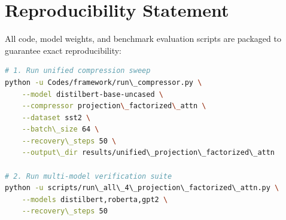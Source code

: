 \section{Reproducibility Statement}
All code, model weights, and benchmark evaluation scripts are packaged to guarantee exact reproducibility:
\begin{lstlisting}[language=bash]
# 1. Run unified compression sweep
python -u Codes/framework/run\_compressor.py \
    --model distilbert-base-uncased \
    --compressor projection\_factorized\_attn \
    --dataset sst2 \
    --batch\_size 64 \
    --recovery\_steps 50 \
    --output\_dir results/unified\_projection\_factorized\_attn

# 2. Run multi-model verification suite
python -u scripts/run\_all\_4\_projection\_factorized\_attn.py \
    --models distilbert,roberta,gpt2 \
    --recovery\_steps 50
\end{lstlisting}

